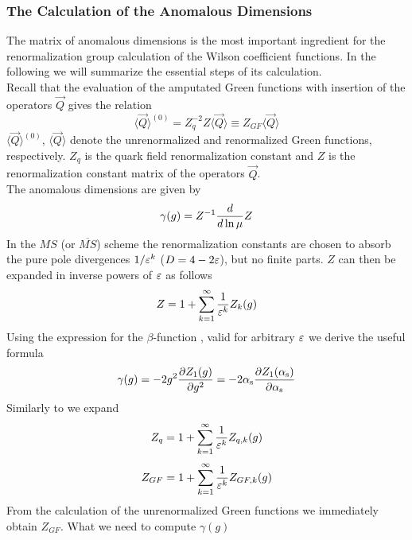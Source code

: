 \subsubsection{The Calculation of the Anomalous Dimensions}
               \label{sec:basicform:wc:adm}
The matrix of anomalous dimensions is the most important ingredient
for the renormalization group calculation of the Wilson coefficient
functions. In the following we will summarize the essential steps of
its calculation.\\
Recall that the evaluation of the amputated Green functions with
insertion of the operators $\vec Q$ gives the relation
\begin{equation}\label{qzgf}
\langle\vec Q\rangle^{(0)}=Z^{-2}_q Z\langle\vec Q\rangle
\equiv Z_{GF}\langle\vec Q\rangle   \end{equation}
$\langle\vec Q\rangle^{(0)}$, $\langle\vec Q\rangle$ denote the
unrenormalized and renormalized Green functions, respectively.
$Z_q$ is the quark field renormalization constant and $Z$ is the
renormalization constant matrix of the operators $\vec Q$.\\
The anomalous dimensions are given by
\begin{equation}\label{gaz2}
\gamma(g)=Z^{-1}{d\over d\ln\mu}Z   \end{equation}
In the $MS$ (or $\overline{MS}$) scheme the renormalization constants
are chosen to absorb the pure pole divergences $1/\varepsilon^k$
($D=4-2\varepsilon$), but no finite parts. $Z$ can then be expanded in
inverse powers of $\varepsilon$ as follows
\begin{equation}\label{zeps}
Z=1+\sum^\infty_{k=1}{1\over\varepsilon^k}Z_k(g)  \end{equation}
Using the expression for the $\beta$-function , valid for
arbitrary $\varepsilon$ we derive the useful formula \cite{floratosetal:77}
\begin{equation}\label{ggz1}
\gamma(g)=-2g^2{\partial Z_1(g)\over\partial g^2}
=-2\alpha_{\rm s}{\partial Z_1(\alpha_{\rm s})\over\partial \alpha_{\rm s}}  \end{equation}
Similarly to  we expand
\begin{equation}\label{zqep}
Z_q=1+\sum^\infty_{k=1}{1\over\varepsilon^k}Z_{q,k}(g)  \end{equation}
\begin{equation}\label{zgfe}
Z_{GF}=1+\sum^\infty_{k=1}{1\over\varepsilon^k}Z_{GF,k}(g)  \end{equation}
From the calculation of the unrenormalized Green functions 
we immediately obtain $Z_{GF}$. What we need to compute $\gamma(g)$
